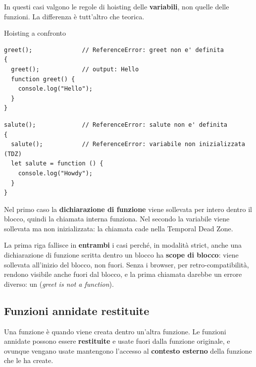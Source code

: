In questi casi valgono le regole di hoisting delle \textbf{variabili}, non
quelle delle funzioni. La differenza è tutt'altro che teorica.

\begin{esempio}{Hoisting a confronto}
\begin{lstlisting}[style=js, name=hoisting-confronto.js]
greet();              // ReferenceError: greet non e' definita
{
  greet();            // output: Hello
  function greet() {
    console.log("Hello");
  }
}
\end{lstlisting}

\begin{lstlisting}[style=js, name=hoisting-confronto2.js]
salute();             // ReferenceError: salute non e' definita
{
  salute();           // ReferenceError: variabile non inizializzata (TDZ)
  let salute = function () {
    console.log("Howdy");
  }
}
\end{lstlisting}

Nel primo caso la \textbf{dichiarazione di funzione} viene sollevata per intero
dentro il blocco, quindi la chiamata interna funziona. Nel secondo la variabile
 viene sollevata ma non inizializzata: la chiamata cade nella
Temporal Dead Zone.

La prima riga fallisce in \textbf{entrambi} i casi perché, in modalità strict,
anche una dichiarazione di funzione scritta dentro un blocco ha \textbf{scope di
blocco}: viene sollevata all'inizio del blocco, non fuori. Senza
 i browser, per retro-compatibilità, rendono 
visibile anche fuori dal blocco, e la prima chiamata darebbe un errore diverso:
un  (\textit{greet is not a function}).
\end{esempio}

\subsection{Funzioni annidate restituite}

Una funzione è  quando viene creata dentro un'altra funzione. Le
funzioni annidate possono essere \textbf{restituite} e usate fuori dalla
funzione originale, e ovunque vengano usate mantengono l'accesso al
\textbf{contesto esterno} della funzione che le ha create.

